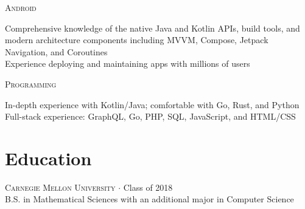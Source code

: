 \documentclass[letterpaper,10pt]{article}
\newenvironment{lcol}
{
    \begin{minipage}[t]{.185\linewidth}
    \begin{flushright}
}
{
    \end{flushright}
    \end{minipage}
}
\newenvironment{rcol}
{
    \begin{minipage}[t]{.8\linewidth}
}
{
    \end{minipage}
}
\begin{document}
\begin{lcol}
    \textsc{ Android}
\end{lcol}
\begin{rcol}
    Comprehensive knowledge of the native Java and Kotlin APIs, build tools, and modern architecture components including MVVM, Compose, Jetpack Navigation, and Coroutines\vspace{4pt} \\
    Experience deploying and maintaining apps with millions of users
\end{rcol}

\vspace{4pt}

\begin{lcol}
    \textsc{Programming}
\end{lcol}
\begin{rcol}
    In-depth experience with Kotlin/Java; comfortable with Go, Rust, and Python
    \vspace{4pt} \\
    Full-stack experience: GraphQL, Go, PHP, SQL, JavaScript, and HTML/CSS
\end{rcol}

\section{Education}

\textsc{Carnegie Mellon University} $\cdot$ Class of 2018 \\
\-\hspace{.28in} B.S. in Mathematical Sciences with an additional major in Computer Science
\end{document}
